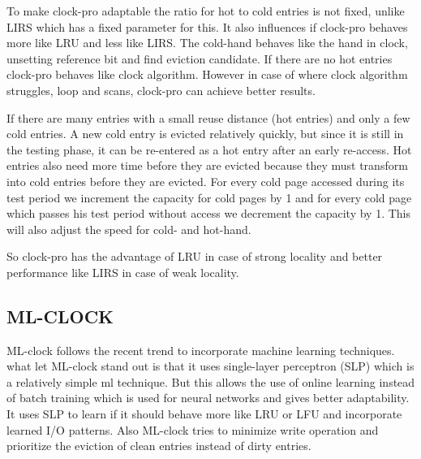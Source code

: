 \documentclass[
	12pt,
	a4paper,
	abstract,
	bibliography=totoc,
	chapterprefix,
	headings=openright,
	numbers=endperiod,
	parskip=half,
	twoside,
]{scrreprt}
\begin{document}
To make clock-pro adaptable the ratio for hot to cold entries is not fixed, unlike LIRS which has a fixed parameter for this.
It also influences if clock-pro behaves more like LRU and less like LIRS.
The cold-hand behaves like the hand in clock, unsetting reference bit and find eviction candidate.
If there are no hot entries clock-pro behaves like clock algorithm. 
However in case of where clock algorithm struggles, loop and scans, clock-pro can achieve better results.

If there are many entries with a small reuse distance (hot entries) and only a few cold entries. A new cold entry is evicted relatively quickly, but since it is still in the testing phase, it can be re-entered as a hot entry after an early re-access.
Hot entries also need more time before they are evicted because they must transform into cold entries before they are evicted.
For every cold page accessed during its test period we increment the capacity for cold pages by 1 and for every cold page which passes his test period without access we decrement the capacity by 1.
This will also adjust the speed  for cold- and hot-hand.

So clock-pro has the advantage of LRU in case of strong locality and better performance like LIRS in case of weak locality.

\subsection{ML-CLOCK}

ML-clock \cite{cho2021ml} follows the recent trend to incorporate machine learning techniques.
what let ML-clock stand out is that it uses single-layer perceptron (SLP) which is a relatively simple ml technique.
But this allows the use of online learning instead of batch training which is used for neural networks and gives better adaptability.
It uses SLP to learn if it should behave more like LRU or LFU and incorporate learned I/O patterns.
Also ML-clock tries to minimize write operation and prioritize the eviction of clean entries instead of dirty entries.
\end{document}
